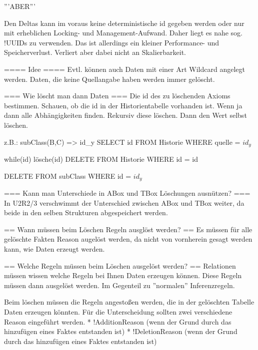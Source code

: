 '''ABER'''

Den Deltas kann im voraus keine deterministische id gegeben werden oder nur mit erheblichen Locking- und Management-Aufwand. Daher liegt es nahe sog. !UUIDs zu verwenden. Das ist allerdings ein kleiner Performance- und Speicherverlust. Verliert aber dabei nicht an Skalierbarkeit.

==== Idee ====
Evtl. können auch Daten mit einer Art Wildcard angelegt werden. Daten, die keine Quellangabe haben werden immer gelöscht.

=== Wie löscht man dann Daten ===
Die id des zu löschenden Axioms bestimmen.
Schauen, ob die id in der Historientabelle vorhanden ist. Wenn ja dann alle Abhängigkeiten finden. Rekursiv diese löschen. Dann den Wert selbst löschen.

z.B.: subClass(B,C) => id\_y
SELECT id FROM Historie WHERE quelle = $id_y$

while(id)
  lösche(id)
  DELETE FROM Historie WHERE id = id

DELETE FROM subClass WHERE id = $id_y$

=== Kann man Unterschiede in ABox und TBox Löschungen ausnützen? ===
In U2R2/3 verschwimmt der Unterschied zwischen ABox und TBox weiter, da beide in den selben Strukturen abgespeichert werden.


== Wann müssen beim Löschen Regeln ausglöst werden? ==
Es müssen für alle gelöschte Fakten Reason augelöst werden, da nicht von vornherein gesagt werden kann, wie Daten erzeugt werden.

== Welche Regeln müssen beim Löschen ausgelöst werden? ==
Relationen müssen wissen welche Regeln bei Ihnen Daten erzeugen können. Diese Regeln müssen dann ausgelöst werden. Im Gegenteil zu ''normalen'' Inferenzregeln.

Beim löschen müssen die Regeln angestoßen werden, die in der gelöschten Tabelle Daten erzeugen könnten. Für die Unterscheidung sollten zwei verschiedene Reason eingeführt werden.
 * !AdditionReason (wenn der Grund durch das hinzufügen eines Faktes entstanden ist)
 * !DeletionReason (wenn der Grund durch das hinzufügen eines Faktes entstanden ist)